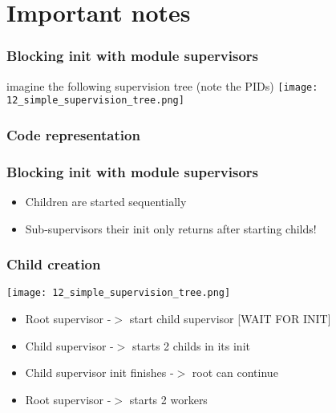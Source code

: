 \section{Important notes}

\frame{\tableofcontents[currentsection]}


\begin{frame}
    \frametitle{Blocking init with module supervisors}
    imagine the following supervision tree (note the PIDs)
    \vfill
    \texttt{[image: 12\_simple\_supervision\_tree.png]}
\end{frame}

\begin{frame}
    \frametitle{Code representation}
\end{frame}

\begin{frame}
    \frametitle{Blocking init with module supervisors}
    \begin{itemize}
        \item Children are started sequentially
        \item Sub-supervisors their init only returns after starting childs!
    \end{itemize}
\end{frame}

\begin{frame}
    \frametitle{Child creation}
    \begin{center}
        \texttt{[image: 12\_simple\_supervision\_tree.png]}
        \begin{itemize}
            \item Root supervisor -$>$ start child supervisor [WAIT FOR INIT]
            \item Child supervisor -$>$ starts 2 childs in its init
            \item Child supervisor init finishes -$>$ root can continue
            \item Root supervisor -$>$ starts 2 workers
        \end{itemize}
    \end{center}
\end{frame}